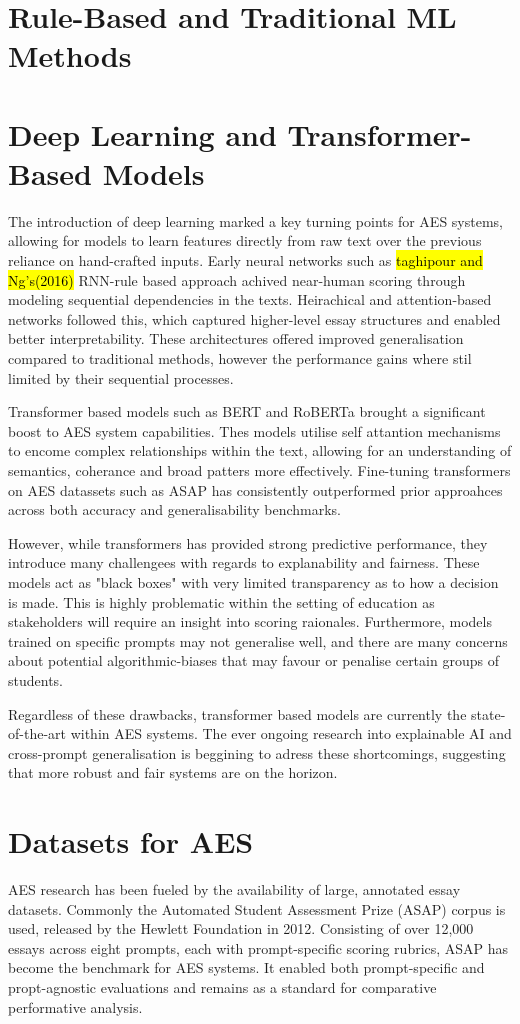 \documentclass[8pt]{report}
\begin{document}
\section{Rule-Based and Traditional ML Methods}


\section{Deep Learning and Transformer-Based Models}
The introduction of deep learning marked a key turning points for AES systems, allowing for models to learn features directly from raw text over the previous reliance on hand-crafted inputs. Early neural networks such as \hl{taghipour and Ng's(2016)}
RNN-rule based approach achived near-human scoring through modeling sequential dependencies in the texts. Heirachical and attention-based networks followed this, which captured higher-level essay structures and enabled better
interpretability. These architectures offered improved generalisation compared to traditional methods, however the performance gains where stil limited by their sequential processes.

Transformer based models such as BERT and RoBERTa brought a significant boost to AES system capabilities. Thes models utilise self attantion mechanisms to encome complex relationships within the text, allowing for an understanding of semantics, coherance 
and broad patters more effectively. Fine-tuning transformers on AES datassets such as ASAP has consistently outperformed prior approahces across both accuracy and generalisability benchmarks.

However, while transformers has provided strong predictive performance, they introduce many challengees with regards to explanability and fairness. These models act as "black boxes" with very limited transparency as to how a
decision is made. This is highly problematic within the setting of education as stakeholders will require an insight into scoring raionales. Furthermore, models trained on specific prompts may not generalise well, and there are many
concerns about potential algorithmic-biases that may favour or penalise certain groups of students.

Regardless of these drawbacks, transformer based models are currently the state-of-the-art within AES systems. The ever ongoing research into explainable AI and cross-prompt generalisation is beggining to adress these shortcomings, suggesting
that more robust and fair systems are on the horizon.

\section{Datasets for AES}
AES research has been fueled by the availability of large, annotated essay datasets. Commonly the Automated Student Assessment Prize (ASAP) corpus is used, released by the Hewlett Foundation in 2012. Consisting of over 12,000
essays across eight prompts, each with prompt-specific scoring rubrics, ASAP has become the benchmark for AES systems. It enabled both prompt-specific and propt-agnostic evaluations and remains as a standard for comparative 
performative analysis.
\end{document}
